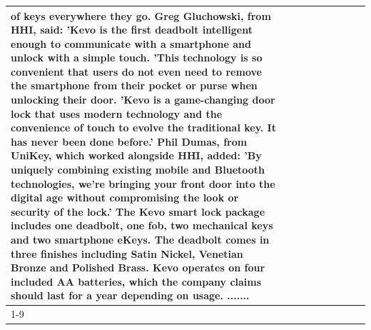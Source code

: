 \begin{table}[H]
\begin{tabular}{lllrlllll}
of keys everywhere they go. Greg Gluchowski, from HHI, said: 'Kevo is the first deadbolt intelligent enough to communicate with a smartphone and unlock with a simple touch. 'This technology is so convenient that users do not even need to remove the smartphone from their pocket or purse when unlocking their door. 'Kevo is a game-changing door lock that uses modern technology and the convenience of touch to evolve the traditional key. It has never been done before.' Phil Dumas, from UniKey, which worked alongside HHI, added: 'By uniquely combining existing mobile and Bluetooth technologies, we’re bringing your front door into the digital age without compromising the look or security of the lock.' The Kevo smart lock package includes one deadbolt, one fob, two mechanical keys and two smartphone eKeys. The deadbolt comes in three finishes including Satin Nickel, Venetian Bronze and Polished Brass. Kevo operates on four included AA batteries, which the company claims should last for a year depending on usage. ....... \\
\cline{1-9}

\end{tabular}
\end{table}
